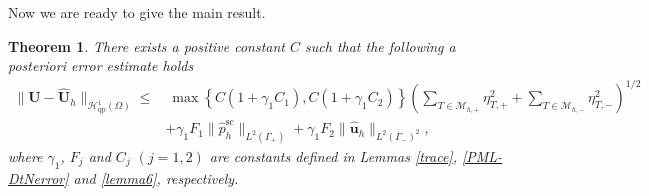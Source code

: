 \documentclass[final,3p,times]{elsarticle}
\newtheorem{theorem}{Theorem}%
\begin{document}
Now we are ready to give the main result.
\begin{theorem}\label{theorem main}
	There exists a positive constant $C$ such that the following a posteriori error estimate holds
	\begin{align*}
		\|\boldsymbol{U}-\hat{\boldsymbol{U}}_h\|_{\mathscr{H}^1_\mathrm{qp}(\Omega)}
		\leq&~ \max\left\{C(1+\gamma_1C_1),C(1+\gamma_1C_2)\right\}\left(\sum_{T \in \mathscr{M}_{h, +}} \eta_{T, +}^2+\sum_{T \in \mathscr{M}_{h, -}} \eta_{T, -}^2\right)^{1 / 2}\\
		&+\gamma_1 F_1\|\hat{p}^{\mathrm{sc}}_h \|_{L^2(\Gamma_+)} + \gamma_1 F_2\|\hat{\boldsymbol{u}}_h \|_{L^2(\Gamma_-)^2},
	\end{align*}
	where $\gamma_1$, $F_j$ and  $C_j$ $(j=1,2)$  are constants defined in Lemmas \ref{trace}, \ref{PML-DtNerror} and \ref{lemma6}, respectively.
\end{theorem}
\end{document}
